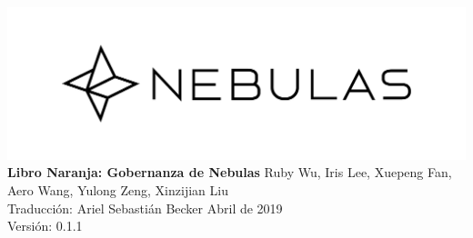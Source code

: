 \documentclass[12pt]{article}
\begin{document}
	\pagestyle{empty}
	\pagecolor{\pcolor}

	\begin{titlepage}
		\begin{center}
			\vspace*{5.5cm}
			\includegraphics[scale=0.4]{../common/Nebulas.png}
			\vspace{0.5cm}
			\textbf{\huge{Libro Naranja: Gobernanza de Nebulas}}
			\vfill
			\vspace{0.5cm}
				Ruby Wu, Iris Lee, Xuepeng Fan, Aero Wang, Yulong Zeng, Xinzijian Liu \\
				Traducción: Ariel Sebastián Becker
			\vfill
			Abril de 2019\\
			Versión: 0.1.1
			\textbf{}
		\end{center}
	\end{titlepage}

	\setcounter{page}{0}

	\tableofcontents

	\newpage
	\setcounter{page}{1}
	\pagestyle{fancy}
	\vspace*{0.01cm}

	\newpage

	\newpage
	\begin{appendices}
		\newpage
	\end{appendices}
\end{document}
